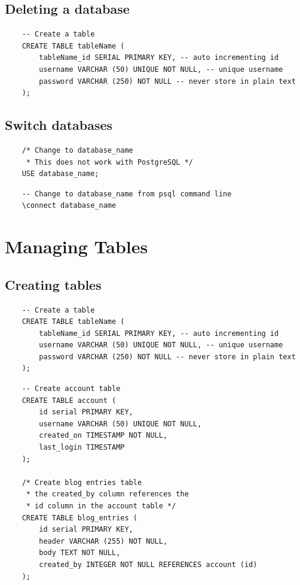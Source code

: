 \subsection{Deleting a database}
\begin{verbatim}
    -- Create a table
    CREATE TABLE tableName (
        tableName_id SERIAL PRIMARY KEY, -- auto incrementing id
        username VARCHAR (50) UNIQUE NOT NULL, -- unique username
        password VARCHAR (250) NOT NULL -- never store in plain text
    );
\end{verbatim}

\subsection{Switch databases}
\begin{verbatim}
    /* Change to database_name
     * This does not work with PostgreSQL */
    USE database_name;
\end{verbatim}

\begin{verbatim}
    -- Change to database_name from psql command line
    \connect database_name
\end{verbatim}


\section{Managing Tables}

\subsection{Creating tables}
\begin{verbatim}
    -- Create a table
    CREATE TABLE tableName (
        tableName_id SERIAL PRIMARY KEY, -- auto incrementing id
        username VARCHAR (50) UNIQUE NOT NULL, -- unique username
        password VARCHAR (250) NOT NULL -- never store in plain text
    );
\end{verbatim}

\begin{verbatim}
    -- Create account table
    CREATE TABLE account (
        id serial PRIMARY KEY,
        username VARCHAR (50) UNIQUE NOT NULL,
        created_on TIMESTAMP NOT NULL, 
        last_login TIMESTAMP
    );
    
    /* Create blog entries table
     * the created_by column references the 
     * id column in the account table */
    CREATE TABLE blog_entries (
        id serial PRIMARY KEY, 
        header VARCHAR (255) NOT NULL,
        body TEXT NOT NULL,
        created_by INTEGER NOT NULL REFERENCES account (id)
    );
\end{verbatim}

